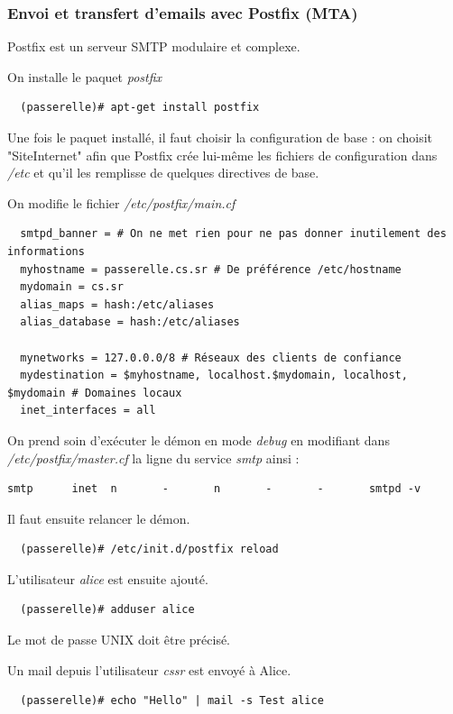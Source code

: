 \documentclass[a4paper]{article}
\begin{document}
\subsubsection{Envoi et transfert d'emails avec Postfix (MTA)}

Postfix est un serveur SMTP modulaire et complexe.

On installe le paquet \textit{postfix}
\begin{verbatim}
  (passerelle)# apt-get install postfix
\end{verbatim}

Une fois le paquet installé, il faut choisir la configuration de base : on choisit
"SiteInternet" afin que Postfix crée lui-même les fichiers de configuration
dans \textit{/etc} et qu'il les remplisse de quelques directives de base.

On modifie le fichier \textit{/etc/postfix/main.cf}
\begin{verbatim}
  smtpd_banner = # On ne met rien pour ne pas donner inutilement des informations
  myhostname = passerelle.cs.sr # De préférence /etc/hostname
  mydomain = cs.sr
  alias_maps = hash:/etc/aliases
  alias_database = hash:/etc/aliases

  mynetworks = 127.0.0.0/8 # Réseaux des clients de confiance
  mydestination = $myhostname, localhost.$mydomain, localhost, $mydomain # Domaines locaux
  inet_interfaces = all
\end{verbatim}

On prend soin d'exécuter le démon en mode \textit{debug} en modifiant 
dans \textit{/etc/postfix/master.cf} la ligne du service \textit{smtp} ainsi :
\begin{verbatim}
smtp      inet  n       -       n       -       -       smtpd -v
\end{verbatim}

Il faut ensuite relancer le démon.
\begin{verbatim}
  (passerelle)# /etc/init.d/postfix reload
\end{verbatim}

L'utilisateur \textit{alice} est ensuite ajouté. 
\begin{verbatim}
  (passerelle)# adduser alice
\end{verbatim}
Le mot de passe UNIX doit être précisé.

Un mail depuis l'utilisateur \textit{cssr} est envoyé à Alice.
\begin{verbatim}
  (passerelle)# echo "Hello" | mail -s Test alice
\end{verbatim}
\end{document}
